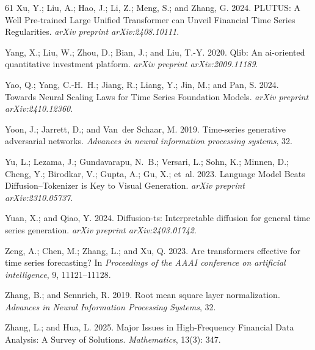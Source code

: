 \documentclass[letterpaper]{article} %
\begin{document}
\begin{thebibliography}{61}
Xu, Y.; Liu, A.; Hao, J.; Li, Z.; Meng, S.; and Zhang, G. 2024.
\newblock PLUTUS: A Well Pre-trained Large Unified Transformer can Unveil
  Financial Time Series Regularities.
\newblock \emph{arXiv preprint arXiv:2408.10111}.

Yang, X.; Liu, W.; Zhou, D.; Bian, J.; and Liu, T.-Y. 2020.
\newblock Qlib: An ai-oriented quantitative investment platform.
\newblock \emph{arXiv preprint arXiv:2009.11189}.

Yao, Q.; Yang, C.-H.~H.; Jiang, R.; Liang, Y.; Jin, M.; and Pan, S. 2024.
\newblock Towards Neural Scaling Laws for Time Series Foundation Models.
\newblock \emph{arXiv preprint arXiv:2410.12360}.

Yoon, J.; Jarrett, D.; and Van~der Schaar, M. 2019.
\newblock Time-series generative adversarial networks.
\newblock \emph{Advances in neural information processing systems}, 32.

Yu, L.; Lezama, J.; Gundavarapu, N.~B.; Versari, L.; Sohn, K.; Minnen, D.;
  Cheng, Y.; Birodkar, V.; Gupta, A.; Gu, X.; et~al. 2023.
\newblock Language Model Beats Diffusion--Tokenizer is Key to Visual
  Generation.
\newblock \emph{arXiv preprint arXiv:2310.05737}.

Yuan, X.; and Qiao, Y. 2024.
\newblock Diffusion-ts: Interpretable diffusion for general time series
  generation.
\newblock \emph{arXiv preprint arXiv:2403.01742}.

Zeng, A.; Chen, M.; Zhang, L.; and Xu, Q. 2023.
\newblock Are transformers effective for time series forecasting?
\newblock In \emph{Proceedings of the AAAI conference on artificial
  intelligence}, 9, 11121--11128.

Zhang, B.; and Sennrich, R. 2019.
\newblock Root mean square layer normalization.
\newblock \emph{Advances in Neural Information Processing Systems}, 32.

Zhang, L.; and Hua, L. 2025.
\newblock Major Issues in High-Frequency Financial Data Analysis: A Survey of
  Solutions.
\newblock \emph{Mathematics}, 13(3): 347.


\end{thebibliography}
\end{document}
